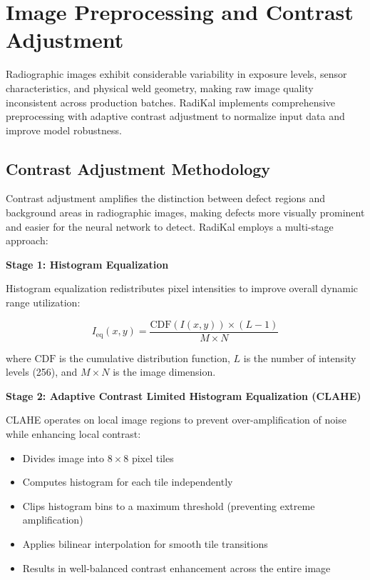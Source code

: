 \documentclass[12pt,a4paper]{report}
\begin{document}
\section{Image Preprocessing and Contrast Adjustment}

Radiographic images exhibit considerable variability in exposure levels, sensor characteristics, and physical weld geometry, making raw image quality inconsistent across production batches. RadiKal implements comprehensive preprocessing with adaptive contrast adjustment to normalize input data and improve model robustness.

\subsection{Contrast Adjustment Methodology}

Contrast adjustment amplifies the distinction between defect regions and background areas in radiographic images, making defects more visually prominent and easier for the neural network to detect. RadiKal employs a multi-stage approach:

\textbf{Stage 1: Histogram Equalization}

Histogram equalization redistributes pixel intensities to improve overall dynamic range utilization:

\begin{equation}
I_{\text{eq}}(x,y) = \frac{\text{CDF}(I(x,y)) \times (L-1)}{M \times N}
\end{equation}

where $\text{CDF}$ is the cumulative distribution function, $L$ is the number of intensity levels (256), and $M \times N$ is the image dimension.

\textbf{Stage 2: Adaptive Contrast Limited Histogram Equalization (CLAHE)}

CLAHE operates on local image regions to prevent over-amplification of noise while enhancing local contrast:

\begin{itemize}
    \item Divides image into $8 \times 8$ pixel tiles
    \item Computes histogram for each tile independently
    \item Clips histogram bins to a maximum threshold (preventing extreme amplification)
    \item Applies bilinear interpolation for smooth tile transitions
    \item Results in well-balanced contrast enhancement across the entire image
\end{itemize}
\end{document}
